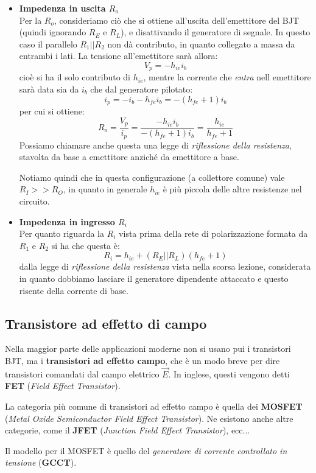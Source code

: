 \documentclass[a4paper,11pt]{article}
\begin{document}
\begin{itemize}
	\item \textbf{\textsf{Impedenza in uscita $R_o$}} \\
Per la $R_o$, consideriamo ciò che si ottiene all'uscita dell'emettitore del BJT (quindi ignorando $R_E$ e $R_L$), e disattivando il generatore di segnale. In questo caso il parallelo $R_1 || R_2$ non dà contributo, in quanto collegato a massa da entrambi i lati. La tensione all'emettitore sarà allora:
$$
V_p = - h_{ie} i_b
$$
cioè si ha il solo contributo di $h_{ie}$, mentre la corrente che \textit{entra} nell emettitore sarà data sia da $i_b$ che dal generatore pilotato:
$$
i_p = -i_b - h_{fe} i_b = -(h_{fe} + 1) i_b
$$
per cui si ottiene:
$$
R_o = \frac{V_p}{i_p} = \frac{ - h_{ie} i_b }{ - (h_{fe} + 1) i_b } = \frac{h_{ie}}{h_{fe} + 1}
$$
Possiamo chiamare anche questa una legge di \textit{riflessione della resistenza}, stavolta da base a emettitore anziché da emettitore a base.

Notiamo quindi che in questa configurazione (a collettore comune) vale $R_I >> R_O$, in quanto in generale $h_{ie}$ è più piccola delle altre resistenze nel circuito.

	\item \textbf{\textsf{Impedenza in ingresso $R_i$}} \\
Per quanto riguarda la $R_i$ vista prima della rete di polarizzazione formata da $R_1$ e $R_2$ si ha che questa è:
$$
R_i = h_{ie} + (R_E || R_L)(h_{fe} + 1)
$$
dalla legge di \textit{riflessione della resistenza} vista nella scorsa lezione, considerata in quanto dobbiamo lasciare il generatore dipendente attaccato e questo risente della corrente di base.
\end{itemize}

\subsection{Transistore ad effetto di campo}
Nella maggior parte delle applicazioni moderne non si usano pui i transistori BJT, ma i \textbf{transistori ad effetto campo}, che è un modo breve per dire transistori comandati dal campo elettrico $\vec{E}$. In inglese, questi vengono detti \textbf{FET} (\textit{Field Effect Transistor}).

La categoria più comune di transistori ad effetto campo è quella dei \textbf{MOSFET} (\textit{Metal Oxide Semiconductor Field Effect Transistor}). Ne esistono anche altre categorie, come il \textbf{JFET} (\textit{Junction Field Effect Transistor}), ecc...

Il modello per il MOSFET è quello del \textit{generatore di corrente controllato in tensione} (\textbf{GCCT}).
\end{document}
